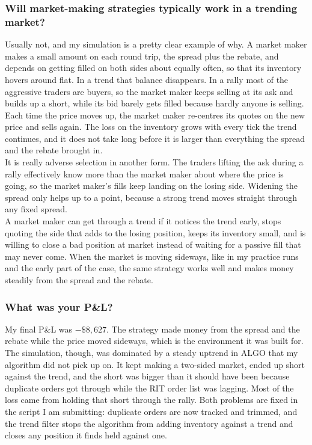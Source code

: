 \documentclass{article}
\begin{document}
\subsubsection{Will market-making strategies typically work in a trending market?}

Usually not, and my simulation is a pretty clear example of why. A market maker makes a small amount on each round trip, the spread plus the rebate, and depends on getting filled on both sides about equally often, so that its inventory hovers around flat. In a trend that balance disappears. In a rally most of the aggressive traders are buyers, so the market maker keeps selling at its ask and builds up a short, while its bid barely gets filled because hardly anyone is selling. Each time the price moves up, the market maker re-centres its quotes on the new price and sells again. The loss on the inventory grows with every tick the trend continues, and it does not take long before it is larger than everything the spread and the rebate brought in.\\

\noindent It is really adverse selection in another form. The traders lifting the ask during a rally effectively know more than the market maker about where the price is going, so the market maker's fills keep landing on the losing side. Widening the spread only helps up to a point, because a strong trend moves straight through any fixed spread.\\

\noindent A market maker can get through a trend if it notices the trend early, stops quoting the side that adds to the losing position, keeps its inventory small, and is willing to close a bad position at market instead of waiting for a passive fill that may never come. When the market is moving sideways, like in my practice runs and the early part of the case, the same strategy works well and makes money steadily from the spread and the rebate.

\subsubsection{What was your P\&L?}

My final P\&L was $-\$8{,}627$. The strategy made money from the spread and the rebate while the price moved sideways, which is the environment it was built for. The simulation, though, was dominated by a steady uptrend in ALGO that my algorithm did not pick up on. It kept making a two-sided market, ended up short against the trend, and the short was bigger than it should have been because duplicate orders got through while the RIT order list was lagging. Most of the loss came from holding that short through the rally. Both problems are fixed in the script I am submitting: duplicate orders are now tracked and trimmed, and the trend filter stops the algorithm from adding inventory against a trend and closes any position it finds held against one.
\end{document}
